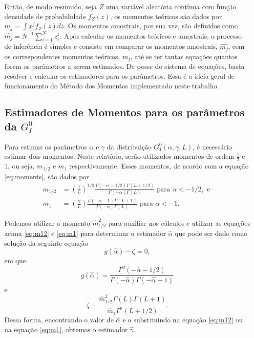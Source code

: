 Então, de modo resumido, seja $Z$ uma variável aleatória contínua com função densidade de probabilidade $f_Z(z)$, os momentos teóricos são dados por $m_j = \int x^jf_Z(z)dz$. Os momentos amostrais, por sua vez, são definidos como $\widehat{m_j} = N^{-1}\sum_{i=1}^{N}z_i^j$. Após calcular os momentos teóricos e amostrais, o processo de inferência é simples e consiste em comparar os momentos amostrais, $\widehat{m_j}$, com os correspondentes momentos teóricos, $m_j$, até se ter tantas equações quantos forem os parâmetros a serem estimados. De posse do sistema de equações, basta resolver e calcular os estimadores para os parâmetros. Essa é a ideia geral de funcionamento do Método dos Momentos implementado neste trabalho.

\subsection{Estimadores de Momentos para os parâmetros da $G_I^0$}

Para estimar os parâmetros $\alpha$ e $\gamma$ da distribuição $G_I^0(\alpha, \gamma, L)$, é necessário estimar dois momentos. 
Neste relatório, serão utilizados momentos de ordem $\frac{1}{2}$ e $1$, ou seja, $m_{1/2}$ e $m_1$ respectivamente. 
Esses momentos, de acordo com a equação \eqref{eq:moments}, são dados por
\begin{align}
    m_{1/2} &= \left ( \frac{\gamma}{L}\right )^{1/2} \frac{\Gamma(-\alpha-1/2)\Gamma(L+1/2)}{\Gamma(-\alpha)\Gamma(L)}  \text{ para } \alpha < -1/2 \label{eq:m12}, \text{ e }\\
    m_{1} &= \left ( \frac{\gamma}{L}\right ) \frac{\Gamma(-\alpha-1)\Gamma(L+1)}{\Gamma(-\alpha)\Gamma(L)} \text{ para } \alpha < -1. \label{eq:m1}
\end{align}

Podemos utilizar o momento $\widehat{m}_{1/2}^2$ para auxiliar nos cálculos e utilizar as equações acima \eqref{eq:m12} e \eqref{eq:m1} para determinar o estimador $\widehat{\alpha}$ que pode ser dado como solução da seguinte equação
\begin{equation}
    g(\widehat{\alpha}) - \zeta = 0,
\end{equation}
em que 
\begin{equation}
    g(\widehat{\alpha}) = \frac{\Gamma^2(-\widehat{\alpha} - 1/2)}{\Gamma(-\widehat{\alpha})\Gamma(-\widehat{\alpha} - 1)}
\end{equation}
e
\begin{equation}
    \zeta = \frac{\widehat{m}_{1/2}^2\Gamma(L)\Gamma(L+1)}{\widehat{m}_{1}\Gamma^2(L+1/2)}.
\end{equation}
Dessa forma, encontrando o valor de $\widehat{\alpha}$ e o substituindo na equação \eqref{eq:m12} ou na equação \eqref{eq:m1}, obtemos o estimador $\widehat{\gamma}$.

